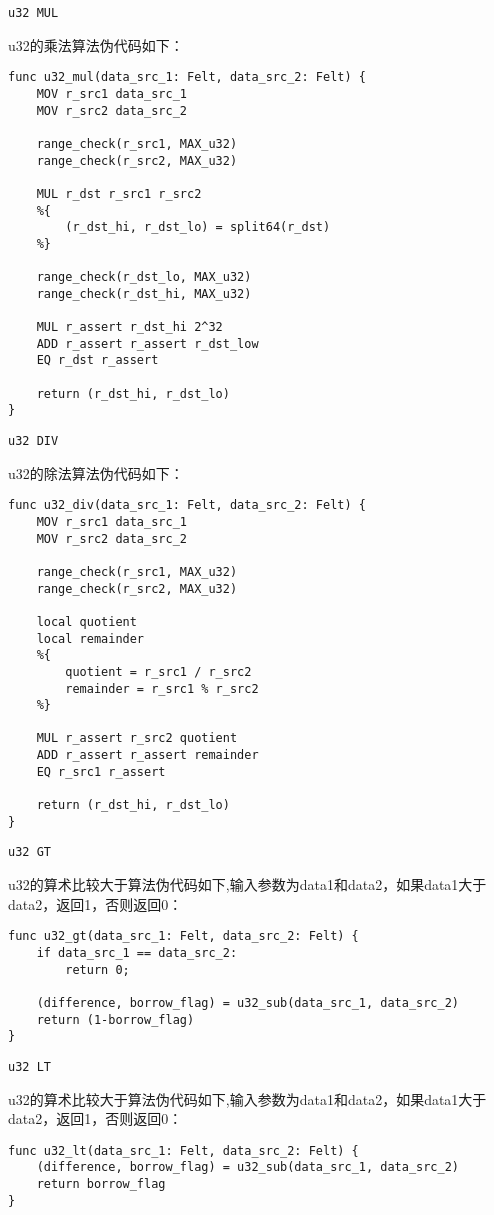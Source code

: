 \verb|u32 MUL|

u32的乘法算法伪代码如下：

\begin{lstlisting}[language={}]
func u32_mul(data_src_1: Felt, data_src_2: Felt) {
    MOV r_src1 data_src_1
    MOV r_src2 data_src_2

    range_check(r_src1, MAX_u32)
    range_check(r_src2, MAX_u32)

    MUL r_dst r_src1 r_src2
    %{
        (r_dst_hi, r_dst_lo) = split64(r_dst)
    %}

    range_check(r_dst_lo, MAX_u32)
    range_check(r_dst_hi, MAX_u32)

    MUL r_assert r_dst_hi 2^32
    ADD r_assert r_assert r_dst_low
    EQ r_dst r_assert

    return (r_dst_hi, r_dst_lo)
}
\end{lstlisting}


\verb|u32 DIV|

u32的除法算法伪代码如下：

\begin{lstlisting}[language={}]
func u32_div(data_src_1: Felt, data_src_2: Felt) {
    MOV r_src1 data_src_1
    MOV r_src2 data_src_2

    range_check(r_src1, MAX_u32)
    range_check(r_src2, MAX_u32)

    local quotient
    local remainder
    %{
        quotient = r_src1 / r_src2
        remainder = r_src1 % r_src2
    %}

    MUL r_assert r_src2 quotient
    ADD r_assert r_assert remainder
    EQ r_src1 r_assert

    return (r_dst_hi, r_dst_lo)
}
\end{lstlisting}

\verb|u32 GT|

u32的算术比较大于算法伪代码如下,输入参数为data1和data2，如果data1大于data2，返回1，否则返回0：

\begin{lstlisting}[language={}]
func u32_gt(data_src_1: Felt, data_src_2: Felt) {
    if data_src_1 == data_src_2:
        return 0;

    (difference, borrow_flag) = u32_sub(data_src_1, data_src_2)
    return (1-borrow_flag)
}
\end{lstlisting}

\verb|u32 LT|

u32的算术比较大于算法伪代码如下,输入参数为data1和data2，如果data1大于data2，返回1，否则返回0：

\begin{lstlisting}[language={}]
func u32_lt(data_src_1: Felt, data_src_2: Felt) {
    (difference, borrow_flag) = u32_sub(data_src_1, data_src_2)
    return borrow_flag
}
\end{lstlisting}